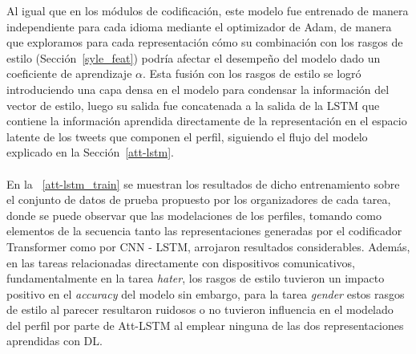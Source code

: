 	Al igual que en los módulos de codificación, este modelo fue entrenado de manera independiente para cada idioma mediante el optimizador de Adam, de manera que exploramos para cada representación cómo su combinación con los rasgos de estilo (Sección~\ref{syle_feat}) podría afectar el desempeño del modelo dado un coeficiente de aprendizaje $\alpha$. Esta fusión con los rasgos de estilo se logró introduciendo una capa densa en el modelo para condensar la información del vector de estilo, luego su salida fue concatenada a la salida de la LSTM que contiene la información aprendida directamente de la representación en el espacio latente de los tweets que componen el perfil, siguiendo el flujo del modelo explicado en la Sección~\ref{att-lstm}.
	\\\\
	En la \tablename~\ref{att-lstm_train} se muestran los resultados de dicho entrenamiento sobre el conjunto de datos de prueba propuesto por los organizadores de cada tarea, donde se puede observar que las modelaciones de los perfiles, tomando como elementos de la secuencia tanto las representaciones generadas por el codificador Transformer como por CNN - LSTM, arrojaron resultados considerables. Además, en las tareas relacionadas directamente con dispositivos comunicativos, fundamentalmente en la tarea \textit{hater}, los rasgos de estilo tuvieron un impacto positivo en el \textit{accuracy} del modelo sin embargo, para la tarea \textit{gender} estos rasgos de estilo al parecer resultaron ruidosos o no  tuvieron influencia en el modelado del perfil por parte de Att-LSTM al emplear ninguna de las dos representaciones aprendidas con DL.
	
